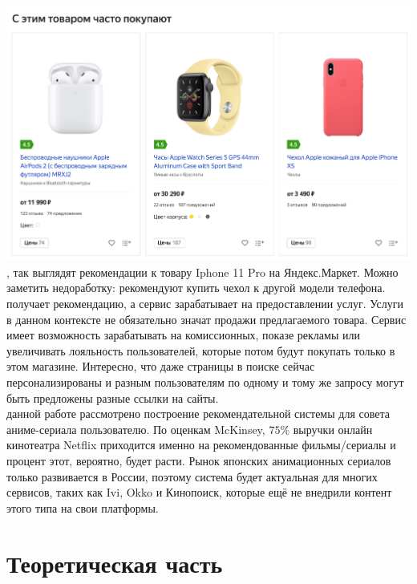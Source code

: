 \documentclass{article}
\newcommand\tab[1][1cm]{\hspace*{#1}}
\begin{document}
\tab\includegraphics[scale=0.30]{f1.png}\\
, так выглядят рекомендации к товару Iphone 11 Pro на Яндекс.Маркет. Можно заметить недоработку: рекомендуют купить чехол к другой модели телефона.\\
 получает рекомендацию, а сервис зарабатывает на предоставлении услуг. Услуги в данном контексте не обязательно значат продажи предлагаемого товара. Сервис имеет возможность зарабатывать на комиссионных, показе рекламы или увеличивать лояльность пользователей, которые потом будут покупать только в этом магазине. Интересно, что даже страницы в поиске сейчас персонализированы и разным пользователям по одному и тому же запросу могут быть предложены разные ссылки на сайты.\\
 данной работе рассмотрено построение рекомендательной системы для совета аниме-сериала пользователю. По оценкам McKinsey, $75\%$ выручки онлайн кинотеатра Netflix приходится именно на рекомендованные фильмы/сериалы и процент этот, вероятно, будет расти. Рынок японских анимационных сериалов только развивается в России, поэтому система будет актуальная для многих сервисов, таких как Ivi, Okko и Кинопоиск, которые ещё не внедрили контент этого типа на свои платформы.\\
\qquad 

\newpage
\section{Теоретическая часть} 
\end{document}
